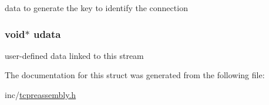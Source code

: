 data to generate the key to identify the connection 

\hypertarget{struct__tcp__stream___a697ce711b67313990d351b5c95f87aed}{
\subsubsection[{udata}]{\setlength{\rightskip}{0pt plus 5cm}void$\ast$ udata}}\label{struct__tcp__stream___a697ce711b67313990d351b5c95f87aed}


user-\/defined data linked to this stream 



The documentation for this struct was generated from the following file\-:\begin{DoxyCompactItemize}
\item 
inc/\hyperlink{tcpreassembly_8h}{tcpreassembly.\-h}\end{DoxyCompactItemize}
